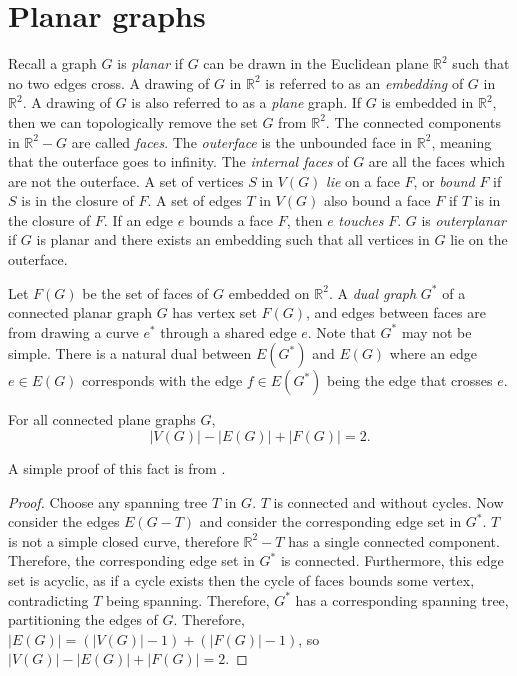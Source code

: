 \section{Planar graphs}\label{sec:Planar graphs}
Recall a graph \(G\) is \textit{planar} if \(G\) can be drawn in the Euclidean plane \( \mathbb{R}^2 \) such that no two edges cross. A drawing of $G$ in $\mathbb{R}^2$ is referred to as an \textit{embedding} of $G$ in $\mathbb{R}^2$. A drawing of $G$ is also referred to as a \textit{plane} graph. If \(G\) is embedded in \(\mathbb{R}^2 \), then we can topologically remove the set $G$ from $\mathbb{R}^2$. The connected components in $\mathbb{R}^2 - G$ are called \textit{faces}. The \textit{outerface} is the unbounded face in $\mathbb{R}^2$, meaning that the outerface goes to infinity. The \textit{internal faces} of $G$ are all the faces which are not the outerface. A set of vertices $S$ in $V(G)$ \textit{lie} on a face $F$, or \textit{bound} $F$ if $S$ is in the closure of $F$. A set of edges $T$ in $V(G)$ also bound a face $F$ if $T$ is in the closure of $F$. If an edge $e$ bounds a face $F$, then $e$ \textit{touches} $F$. \(G\) is \textit{outerplanar} if \(G\) is planar and there exists an embedding such that all vertices in \(G\) lie on the outerface.

Let \(F(G)\) be the set of faces of \(G\) embedded on \(\mathbb{R}^2\). 
A \textit{dual graph} $G^*$ of a connected planar graph $G$ has vertex set $F(G)$, and edges between faces are from drawing a curve $e^*$ through a shared edge $e$. Note that $G^*$ may not be simple. There is a natural dual between $E(G^*)$ and $E(G)$ where an edge $e \in E(G)$ corresponds with the edge $f \in E(G^*)$ being the edge that crosses $e$. 

\begin{theorem}\label{thm:Euler_planar}
	For all connected plane graphs $G$, 
	\begin{equation}
		|V(G)| - |E(G)| + |F(G)| = 2.
	\end{equation}
\end{theorem}

A simple proof of this fact is from \textcite{staudtGeometrieLage1847}.

\begin{proof}
	Choose any spanning tree $T$ in $G$. $T$ is connected and without cycles. Now consider the edges $E(G - T)$ and consider the corresponding edge set in $G^*$. $T$ is not a simple closed curve, therefore $\mathbb{R}^2 - T$ has a single connected component. Therefore, the corresponding edge set in $G^*$ is connected. Furthermore, this edge set is acyclic, as if a cycle exists then the cycle of faces bounds some vertex, contradicting $T$ being spanning. Therefore, $G^*$ has a corresponding spanning tree, partitioning the edges of $G$. Therefore, $|E(G)| = (|V(G)| - 1) + (|F(G)| - 1)$, so $|V(G)| - |E(G)| + |F(G)| = 2$. 
\end{proof}

